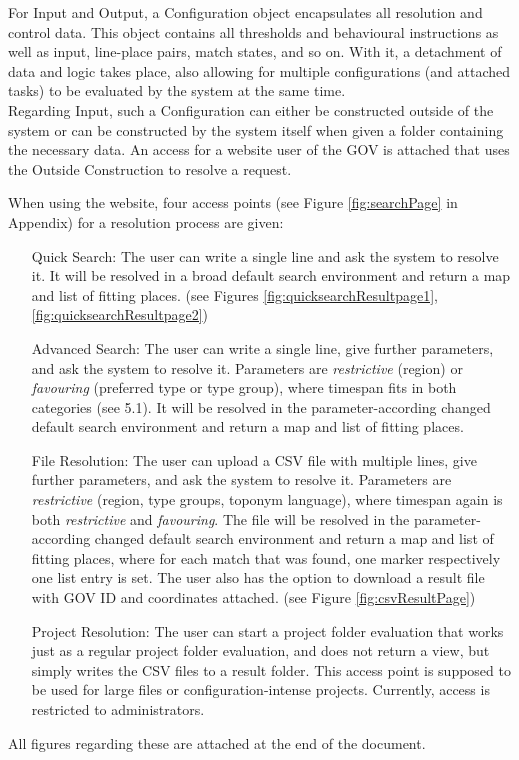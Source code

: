 \documentclass[11pt]{article}
\begin{document}
For Input and Output, a Configuration object encapsulates all resolution and control data. This object contains all thresholds and behavioural instructions as well as input, line-place pairs, match states, and so on. With it, a detachment of data and logic takes place, also allowing for multiple configurations (and attached tasks) to be evaluated by the system at the same time.\\

Regarding Input, such a Configuration can either be constructed outside of the system or can be constructed by the system itself when given a folder containing the necessary data. An access for a website user of the GOV is attached that uses the Outside Construction to resolve a request.

When using the website, four access points (see Figure \ref{fig:searchPage} in Appendix) for a resolution process are given:
\begin{itemize}
\item[Quick Search:] The user can write a single line and ask the system to resolve it. It will be resolved in a broad default search environment and return a map and list of fitting places. (see Figures \ref{fig:quicksearchResultpage1}, \ref{fig:quicksearchResultpage2})
\item[Advanced Search:] The user can write a single line, give further parameters, and ask the system to resolve it. Parameters are \emph{restrictive} (region) or \emph{favouring} (preferred type or type group), where timespan fits in both categories (see 5.1). It will be resolved in the parameter-according changed default search environment and return a map and list of fitting places.
\item[File Resolution:] The user can upload a CSV file with multiple lines, give further parameters, and ask the system to resolve it. Parameters are \emph{restrictive} (region, type groups, toponym language), where timespan again is both \emph{restrictive} and \emph{favouring}. The file will be resolved in the parameter-according changed default search environment and return a map and list of fitting places, where for each match that was found, one marker respectively one list entry is set. The user also has the option to download a result file with GOV ID and coordinates attached. (see Figure \ref{fig:csvResultPage})
\item[Project Resolution:] The user can start a project folder evaluation that works just as a regular project folder evaluation, and does not return a view, but simply writes the CSV files to a result folder. This access point is supposed to be used for large files or configuration-intense projects. Currently, access is restricted to administrators.
\end{itemize}
All figures regarding these are attached at the end of the document.\\
\end{document}
